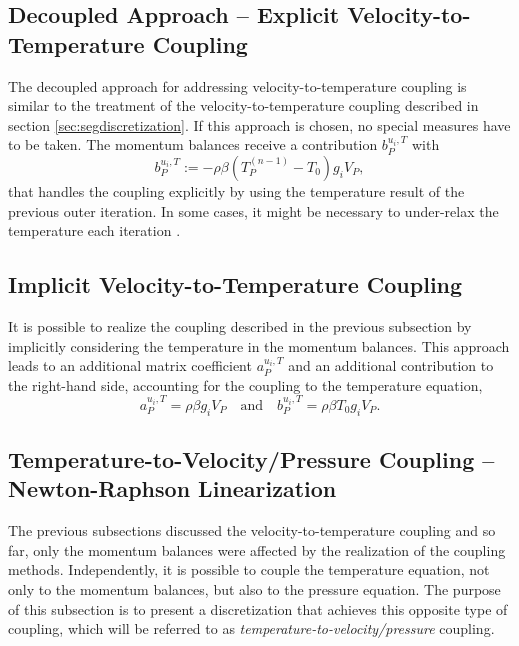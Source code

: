 \subsection{Decoupled Approach -- Explicit Velocity-to-Temperature Coupling}

The decoupled approach for addressing velocity-to-temperature coupling is similar to the treatment of the velocity-to-temperature coupling described in section \ref{sec:segdiscretization}. If this approach is chosen, no special measures have to be taken. The momentum balances receive a contribution \( b_P^{u_i,T}\) with
\begin{displaymath}
  b_P^{u_i,T} := - \rho \beta \left( T_P^{(n-1)} - T_0 \right) g_i V_P,
\end{displaymath}
that handles the coupling explicitly by using the temperature result of the previous outer iteration. In some cases, it might be necessary to under-relax the temperature each iteration \cite{ferziger02}.

\subsection{Implicit Velocity-to-Temperature Coupling}

It is possible to realize the coupling described in the previous subsection by implicitly considering the temperature in the momentum balances. This approach leads to an additional matrix coefficient \(a_P^{u_i,T}\) and an additional contribution to the right-hand side, accounting for the coupling to the temperature equation,
\begin{displaymath}
  a_P^{u_i,T} = \rho \beta g_i V_P 
  \quad \text{and} \quad
  b_P^{u_i,T} = \rho \beta T_0 g_i V_P.
\end{displaymath}

\subsection{Temperature-to-Velocity/Pressure Coupling -- Newton-Raphson Linearization}
\label{sec:nrcoupled}

The previous subsections discussed the velocity-to-temperature coupling and so far, only the momentum balances were affected by the realization of the coupling methods. Independently, it is possible to couple the temperature equation, not only to the momentum balances, but also to the pressure equation. The purpose of this subsection is to present a discretization that achieves this opposite type of coupling, which will be referred to as \emph{temperature-to-velocity/pressure} coupling.

